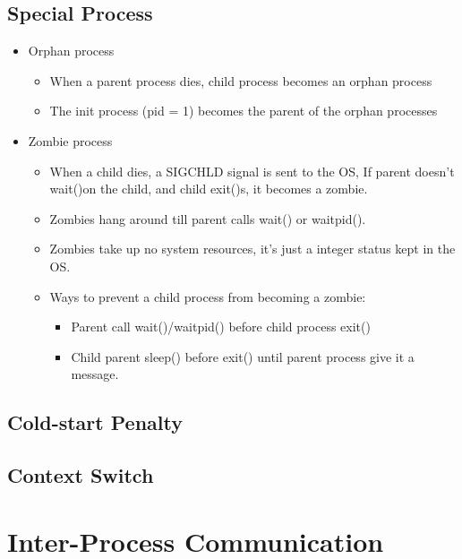 \documentclass[12pt]{article}
\begin{document}
\subsection{Special Process}
\begin{itemize}
    \item Orphan process \begin{itemize}
        \item When a parent process dies, child process becomes an orphan process
        \item The init process (pid = 1) becomes the parent of the orphan processes
    \end{itemize}
    \item Zombie process \begin{itemize}
        \item When a child dies, a SIGCHLD signal is sent to the OS, If parent doesn’t wait()on the child, and child exit()s, it becomes a zombie.
        \item Zombies hang around till parent calls wait() or waitpid().
        \item Zombies take up no system resources, it's just a integer status kept in the OS.
        \item Ways to prevent a child process from becoming a zombie: \begin{itemize}
            \item Parent call wait()/waitpid() before child process exit()
            \item Child parent sleep() before exit() until parent process give it a message.
        \end{itemize}
    \end{itemize}
\end{itemize}

\subsection{Cold-start Penalty}
\subsection{Context Switch}

\section{Inter-Process Communication}
\end{document}
